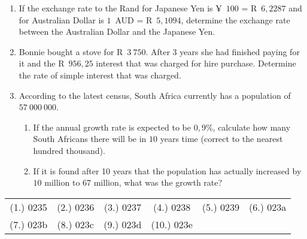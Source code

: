 \begin{eocexercises}{}
\begin{enumerate}[label=\textbf{\arabic*}.]
	\item If the exchange rate to the Rand for Japanese Yen is
          ¥~$100$ = R~$6,2287$ and for Australian Dollar is $1$~AUD =
          R~$5,1094$, determine the exchange rate between the
          Australian Dollar and the Japanese Yen.

	\item Bonnie bought a stove for R~$3~750$. After $3$ years she had finished paying for it and the R~$956,25$ interest that was charged for hire purchase. Determine the rate of simple interest that was charged.

	\item According to the latest census, South Africa currently has a population of $57~000~000$.
	\begin{enumerate}[noitemsep, label=\textbf{(\alph*)} ]
	    \item If the annual growth rate is expected to be $0,9\%$, calculate how many South Africans there will be in $10$ years time (correct to the nearest hundred thousand).

	    \item If it is found after 10 years that the population has actually increased by $10$ million to $67$ million, what was the growth rate?
	\end{enumerate}

    \end{enumerate}
\practiceinfo

    \begin{tabular}[h]{cccccc}
	(1.) 0235 & (2.) 0236 & (3.) 0237 & (4.) 0238 & (5.) 0239 & (6.) 023a \\
	(7.) 023b & (8.) 023c & (9.) 023d & (10.) 023e\\
    \end{tabular}
\end{eocexercises}
